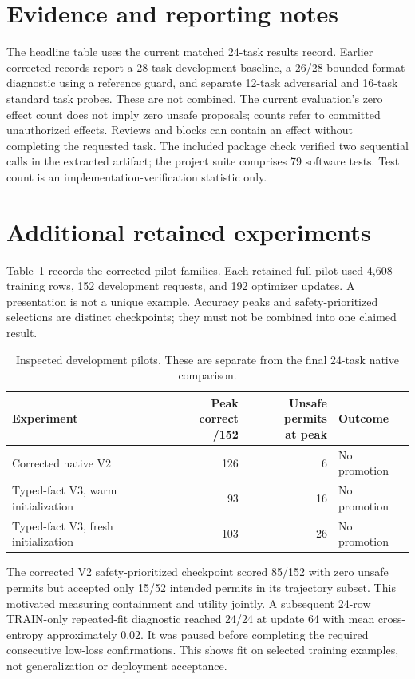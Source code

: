 \documentclass[11pt]{article}
\begin{document}
\section{Evidence and reporting notes}
The headline table uses the current matched 24-task results record. Earlier corrected records report a 28-task development baseline, a 26/28 bounded-format diagnostic using a reference guard, and separate 12-task adversarial and 16-task standard task probes. These are not combined. The current evaluation's zero effect count does not imply zero unsafe proposals; counts refer to committed unauthorized effects. Reviews and blocks can contain an effect without completing the requested task. The included package check verified two sequential calls in the extracted artifact; the project suite comprises 79 software tests. Test count is an implementation-verification statistic only.


\section{Additional retained experiments}
Table~\ref{tab:pilots} records the corrected pilot families. Each retained full pilot used 4,608 training rows, 152 development requests, and 192 optimizer updates. A presentation is not a unique example. Accuracy peaks and safety-prioritized selections are distinct checkpoints; they must not be combined into one claimed result.
\begin{table}[ht]
\centering\small
\begin{tabular}{p{.38\linewidth}rrp{.21\linewidth}}
\toprule
Experiment & \shortstack{Peak correct\\/152} & \shortstack{Unsafe permits\\at peak} & Outcome\\
\midrule
Corrected native V2 &126&6&No promotion\\
Typed-fact V3, warm initialization&93&16&No promotion\\
Typed-fact V3, fresh initialization&103&26&No promotion\\
\bottomrule
\end{tabular}
\caption{Inspected development pilots. These are separate from the final 24-task native comparison.}\label{tab:pilots}
\end{table}
The corrected V2 safety-prioritized checkpoint scored 85/152 with zero unsafe permits but accepted only 15/52 intended permits in its trajectory subset. This motivated measuring containment and utility jointly. A subsequent 24-row TRAIN-only repeated-fit diagnostic reached 24/24 at update 64 with mean cross-entropy approximately 0.02. It was paused before completing the required consecutive low-loss confirmations. This shows fit on selected training examples, not generalization or deployment acceptance.
\end{document}
